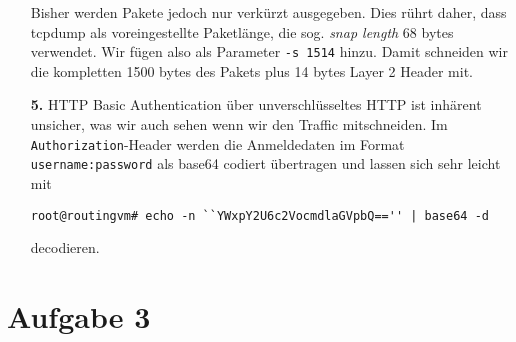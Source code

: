 \documentclass{scrartcl}
\begin{document}
\begin{enumerate}
                      Bisher werden Pakete jedoch nur verkürzt ausgegeben. Dies
                      rührt daher, dass tcpdump als voreingestellte Paketlänge,
                      die sog. \textit{snap length} 68 bytes verwendet. Wir fügen
                      also als Parameter \texttt{-s 1514} hinzu. Damit schneiden
                      wir die kompletten 1500 bytes des Pakets plus 14 bytes Layer 2
                      Header mit.

        \item[\bf 5.] HTTP Basic Authentication über unverschlüsseltes HTTP ist
                      inhärent unsicher, was wir auch sehen wenn wir den Traffic
                      mitschneiden. Im \texttt{Authorization}-Header werden die
                      Anmeldedaten im Format \texttt{username:password} als base64
                      codiert übertragen und lassen sich sehr leicht mit
                      \begin{lstlisting}[style=BashInputStyle]
root@routingvm# echo -n ``YWxpY2U6c2VocmdlaGVpbQ=='' | base64 -d
                      \end{lstlisting}
                      decodieren.
    \end{enumerate}

    \section{Aufgabe 3}
    \label{sec:Aufgabe 3}
\end{document}
